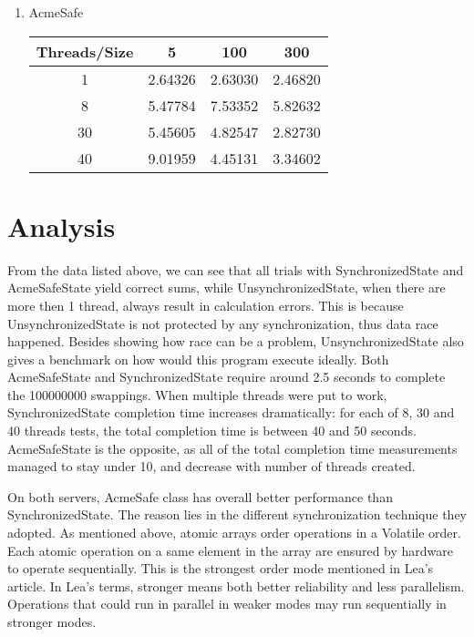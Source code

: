 \documentclass[letterpaper,twocolumn,10pt]{article}
\begin{document}
\begin{enumerate}
\begin{enumerate}
\begin{center}
\begin{tabular}{|c|c|c|c|}
      \hline
      \end{tabular}
    \end{center}
    \item 
    AcmeSafe 
    \begin{center}
      \begin{tabular}{|c|c|c|c|}
      \hline
        Threads/Size & 5 & 100 & 300 \\
      \hline 1 & 2.64326 & 2.63030 & 2.46820 \\
      \hline 8 & 5.47784 & 7.53352 & 5.82632 \\
      \hline 30 & 5.45605 & 4.82547 & 2.82730 \\
      \hline 40 & 9.01959 & 4.45131 & 3.34602 \\
      \hline
      \end{tabular}
    \end{center}
  \end{enumerate}
\end{enumerate}


\section{Analysis}


From the data listed above, we can see that all trials with SynchronizedState and AcmeSafeState yield correct sums, 
while UnsynchronizedState, when there are more then 1 thread, always result in calculation errors.
This is because UnsynchronizedState is not protected by any synchronization, thus data race happened.
Besides showing how race can be a problem, UnsynchronizedState also gives a benchmark on how would this program execute ideally.
Both AcmeSafeState and SynchronizedState require around 2.5 seconds to complete the 100000000 swappings.
When multiple threads were put to work, SynchronizedState completion time increases dramatically:
for each of 8, 30 and 40 threads tests, the total completion time is between 40 and 50 seconds.
AcmeSafeState is the opposite, as all of the total completion time measurements managed to stay under 10, and decrease with number of threads created.


On both servers, AcmeSafe class has overall better performance than SynchronizedState.
The reason lies in the different synchronization technique they adopted.
As mentioned above, atomic arrays order operations in a Volatile order.
Each atomic operation on a same element in the array are ensured by hardware to operate sequentially.
This is the strongest order mode mentioned in Lea's article.
In Lea's terms, stronger means both better reliability and less parallelism.
Operations that could run in parallel in weaker modes may run sequentially in stronger modes.
\end{document}
